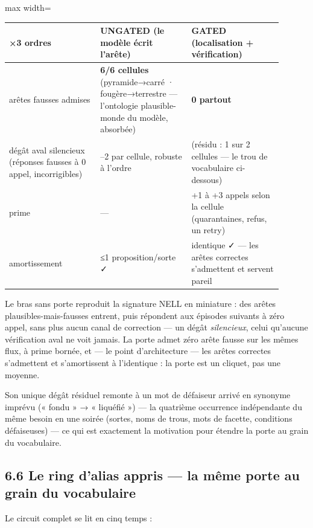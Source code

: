 \documentclass[11pt]{article}
\begin{document}
\begin{center}\small\begin{adjustbox}{max width=\linewidth}\begin{tabular}{>{\raggedright\arraybackslash}p{0.301\linewidth}>{\raggedright\arraybackslash}p{0.301\linewidth}>{\raggedright\arraybackslash}p{0.301\linewidth}}\toprule
×3 ordres & UNGATED (le modèle écrit l'arête) & GATED (localisation + vérification) \\ \midrule
arêtes fausses admises & \textbf{6/6 cellules} (pyramide→carré · fougère→terrestre — l'ontologie plausible-monde du modèle, absorbée) & \textbf{0 partout} \\
dégât aval silencieux (réponses fausses à 0 appel, incorrigibles) & 1–2 par cellule, robuste à l'ordre & 0 (résidu : 1 sur 2 cellules — le trou de vocabulaire ci-dessous) \\
prime & — & +1 à +3 appels selon la cellule (quarantaines, refus, un retry) \\
amortissement & ≤1 proposition/sorte ✓ & identique ✓ — les arêtes correctes s'admettent et servent pareil \\
\bottomrule\end{tabular}\end{adjustbox}\end{center}

Le bras sans porte reproduit la signature NELL en miniature : des arêtes plausibles-mais-fausses entrent, puis répondent aux épisodes suivants à zéro appel, sans plus aucun canal de correction — un dégât \emph{silencieux}, celui qu'aucune vérification aval ne voit jamais. La porte admet zéro arête fausse sur les mêmes flux, à prime bornée, et — le point d'architecture — les arêtes correctes s'admettent et s'amortissent à l'identique : la porte est un cliquet, pas une moyenne.

Son unique dégât résiduel remonte à un mot de défaiseur arrivé en synonyme imprévu (« fondu » → « liquéfié ») — la quatrième occurrence indépendante du même besoin en une soirée (sortes, noms de trous, mots de facette, conditions défaiseuses) — ce qui est exactement la motivation pour étendre la porte au grain du vocabulaire.

\subsection*{6.6 Le ring d'alias appris — la même porte au grain du vocabulaire}

Le circuit complet se lit en cinq temps :
\end{document}
